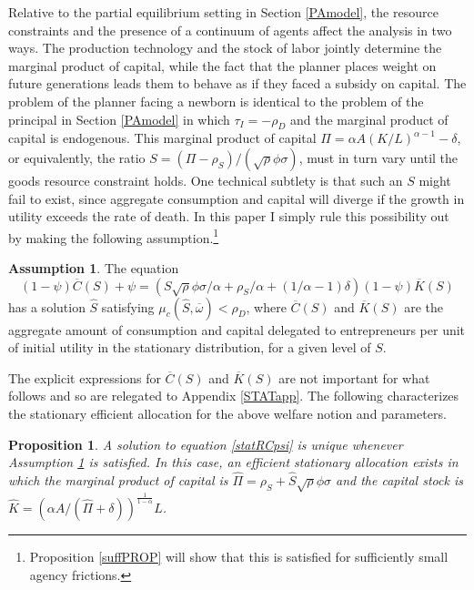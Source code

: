 \documentclass[11pt]{article}
\theoremstyle{plain}
\newtheorem{prop}[thm]{Proposition}
\theoremstyle{definition} %
\newtheorem{assump}{Assumption}[section]
\begin{document}
Relative to the partial equilibrium setting in Section \ref{PAmodel}, the resource constraints and the presence of a continuum of agents affect the analysis in two ways. The production technology and the stock of labor jointly determine the marginal product of capital, while the fact that the planner places weight on future generations leads them to behave as if they faced a subsidy on capital. The problem of the planner facing a newborn is identical to the problem of the principal in Section \ref{PAmodel} in which $\tau_I = -\rho_D$ and the marginal product of capital is endogenous. This marginal product of capital $\Pi = \alpha A(K/L)^{\alpha-1} - \delta$, or equivalently, the ratio $S = (\Pi - \rho_S)/(\sqrt{\rho}\phi \sigma)$, must in turn vary until the goods resource constraint holds. One technical subtlety is that such an $S$ might fail to exist, since aggregate consumption and capital will diverge if the growth in utility exceeds the rate of death. In this paper I simply rule this possibility out by making the following assumption.\footnote{Proposition \ref{suffPROP} will show that this is satisfied for sufficiently small agency frictions.}

\begin{assump} \label{existSTAT}
The equation 
\begin{equation}
(1-\psi)\overline{C}(S) + \psi = {\left(S\sqrt{\rho}\phi \sigma/\alpha + \rho_S/\alpha + (1/\alpha-1)\delta \right)}(1-\psi)\overline{K}(S)
\label{statRCpsi}
\end{equation}
has a solution $\hat{S}$ satisfying $\mu_c(\hat{S},\overline{\omega}) < \rho_D$, where $\overline{C}(S)$ and $\overline{K}(S)$ are the aggregate amount of consumption and capital delegated to entrepreneurs per unit of initial utility in the stationary distribution, for a given level of $S$. 
\end{assump}

The explicit expressions for $\overline{C}(S)$ and $\overline{K}(S)$ are not important for what follows and so are relegated to Appendix \ref{STATapp}. The following characterizes the stationary efficient allocation for the above welfare notion and parameters. 

\begin{prop}\label{statINEQ}
A solution to equation \eqref{statRCpsi} is unique whenever Assumption \ref{existSTAT} is satisfied. In this case, an efficient stationary allocation exists in which the marginal product of capital is $\hat{\Pi} = \rho_S + \hat{S}\sqrt{\rho}\phi \sigma$ and the capital stock is $\hat{K} = (\alpha A/(\hat{\Pi} + \delta))^{\frac{1}{1-\alpha}}L$.
\end{prop}
\end{document}
